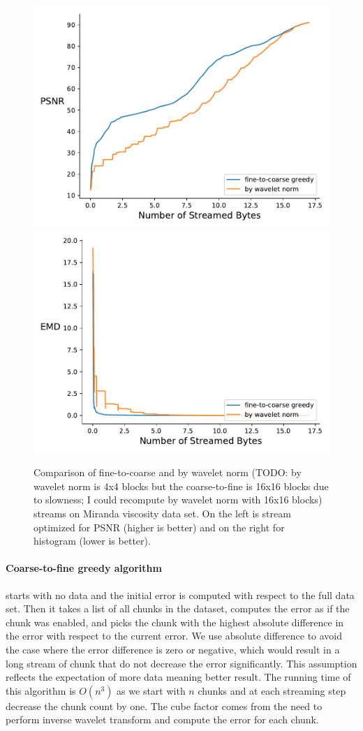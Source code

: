\begin{figure}
        \centering
        \includegraphics[width=0.48\linewidth]{img/figure4_new/rmse-miranda-viscosity}
        \includegraphics[width=0.48\linewidth]{img/figure4_new/histogram-miranda-viscosity}
        \caption{Comparison of fine-to-coarse and by wavelet norm (TODO: by wavelet norm is 4x4 blocks but the coarse-to-fine is 16x16 blocks due to slowness; I could recompute by wavelet norm with 16x16 blocks) streams on Miranda viscosity data set.
                 On the left is stream optimized for PSNR (higher is better) and on the right for histogram (lower is better).}
\end{figure}


\paragraph*{Coarse-to-fine greedy algorithm} starts with no data and the initial error is computed with respect
to the full data set. Then it takes a list of all chunks in the dataset, computes the error as if the chunk was
enabled, and picks the chunk with the highest absolute difference in the error with respect to the current error.
We use absolute difference to avoid the case where the error difference is zero or negative, which would result
in a long stream of chunk that do not decrease the error significantly. This assumption reflects the expectation
of more data meaning better result. The running time of this algorithm is $O(n^3)$ as we start with $n$ chunks
and at each streaming step decrease the chunk count by one. The cube factor comes from the need to perform inverse
wavelet transform and compute the error for each chunk.


